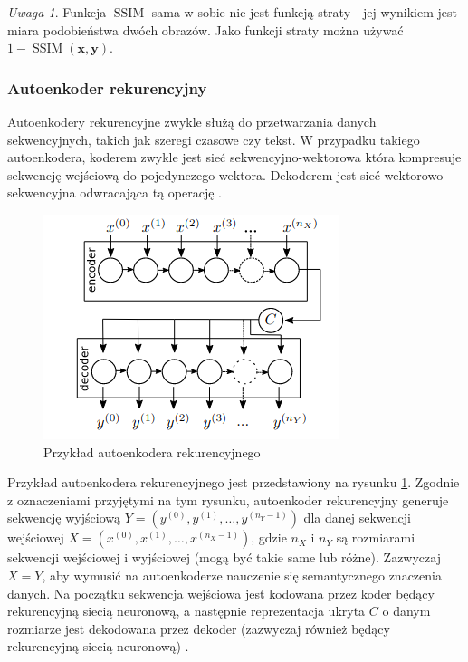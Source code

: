 \documentclass[12pt]{mwbk}
\theoremstyle{plain}
\theoremstyle{definition}
\theoremstyle{remark}
\newtheorem{uwaga}{Uwaga}[chapter]
\newcommand\zrodlo[1]{\par\vspace{-3mm}{\small\textit{Źródło: }#1 }}
\begin{document}
\begin{uwaga}
	Funkcja $\operatorname{SSIM}$ sama w sobie nie jest funkcją straty - jej wynikiem jest miara podobieństwa dwóch obrazów. Jako funkcji straty można używać $1-\operatorname{SSIM}(\mathbf{x}, \mathbf{y})$.
\end{uwaga}


\subsubsection{Autoenkoder rekurencyjny}

Autoenkodery rekurencyjne zwykle służą do przetwarzania danych sekwencyjnych, takich jak szeregi czasowe czy tekst. W przypadku takiego autoenkodera, koderem zwykle jest sieć sekwencyjno-wektorowa która kompresuje sekwencję wejściową do pojedynczego wektora. Dekoderem jest sieć wektorowo-sekwencyjna odwracająca tą operację \cite{geron}.

\begin{figure}[!h]
	\centering
	\includegraphics[width=0.7\linewidth]{rys/recurrent_autoencoder.png}
	\caption{Przykład autoenkodera rekurencyjnego}
	\zrodlo{\cite{susik}}
	\label{fig:rae}
\end{figure}

Przykład autoenkodera rekurencyjnego jest przedstawiony na rysunku \ref{fig:rae}. Zgodnie z oznaczeniami przyjętymi na tym rysunku, autoenkoder rekurencyjny generuje sekwencję wyjściową $Y=(y^{(0)}, y^{(1)}, \ldots, y^{(n_Y-1)})$ dla danej sekwencji wejściowej $X=(x^{(0)}, x^{(1)}, \ldots, x^{(n_X-1)})$, gdzie $n_X$ i $n_Y$ są rozmiarami sekwencji wejściowej i wyjściowej (mogą być takie same lub różne). Zazwyczaj $X=Y$, aby wymusić na autoenkoderze nauczenie się semantycznego znaczenia danych. Na początku sekwencja wejściowa jest kodowana przez koder będący rekurencyjną siecią neuronową, a następnie reprezentacja ukryta $C$ o danym rozmiarze jest dekodowana przez dekoder (zazwyczaj również będący rekurencyjną siecią neuronową) \cite{susik}.
\end{document}
